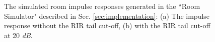 \documentclass[a4paper]{article}
\begin{document}
\begin{figure}%
  \begin{center}
    \vspace{-2mm}
    \\
    \vspace{-2mm}
    \\
    \caption {
      The simulated room impulse responses generated in the
      ``Room Simulator" described in Sec. \ref{sec:implementation}:
      (a) The impulse response without the RIR tail cut-off,
      (b) with the RIR tail cut-off at 20 \textit{dB}.
    }
   \vspace{-8mm}
  \label{fig:rir_cutoff}
  \end{center}
\end{figure}
%
%
\end{document}
